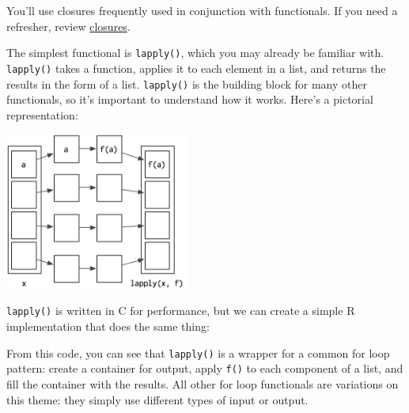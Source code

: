 You'll use closures frequently used in conjunction with functionals. If
you need a refresher, review \hyperref[closures]{closures}.


The simplest functional is \texttt{lapply()}, which you may already be
familiar with. \texttt{lapply()} takes a function, applies it to each
element in a list, and returns the results in the form of a list.
\texttt{lapply()} is the building block for many other functionals, so
it's important to understand how it works. Here's a pictorial
representation: 

\includegraphics[width=2.4in]{diagrams/lapply.png}

\texttt{lapply()} is written in C for performance, but we can create a
simple R implementation that does the same thing:

\begin{Shaded}
\begin{Highlighting}[]
\StringTok{ }
  \StringTok{ }\NormalTok{(}\NormalTok{, }
    \StringTok{ }
  \NormalTok{\}}
\NormalTok{\}}
\end{Highlighting}
\end{Shaded}

From this code, you can see that \texttt{lapply()} is a wrapper for a
common for loop pattern: create a container for output, apply
\texttt{f()} to each component of a list, and fill the container with
the results. All other for loop functionals are variations on this
theme: they simply use different types of input or output.

